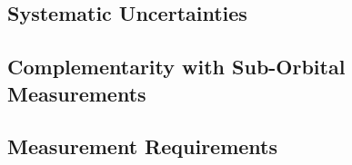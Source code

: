 \documentclass[11pt]{article}
\begin{document}



\subsection{Systematic Uncertainties}%
\label{sec:systematics}



\subsection{Complementarity with Sub-Orbital Measurements}
\label{sec:complementarity}




\subsection{Measurement Requirements} %
\label{sec:requirements}






%



%



%



%

 

\newpage
\def\bibfont{\footnotesize}
\setlength{\bibsep}{1pt}




\end{document}
